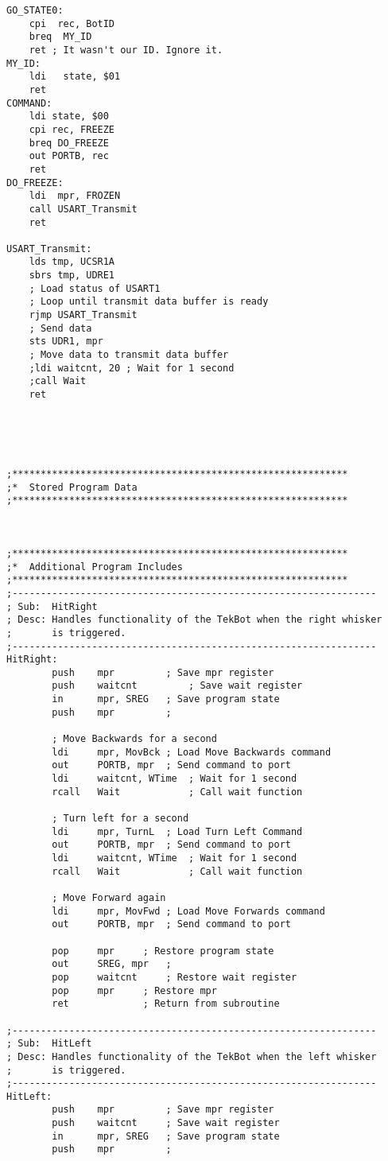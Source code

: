 \documentclass[12pt,letterpaper]{article}
\begin{document}
\begin{verbatim}
GO_STATE0:
    cpi  rec, BotID
    breq  MY_ID
    ret ; It wasn't our ID. Ignore it.
MY_ID:
    ldi   state, $01
    ret
COMMAND:
    ldi state, $00
    cpi rec, FREEZE
    breq DO_FREEZE
    out PORTB, rec
    ret
DO_FREEZE:
    ldi  mpr, FROZEN
    call USART_Transmit
    ret

USART_Transmit:
    lds tmp, UCSR1A
    sbrs tmp, UDRE1
    ; Load status of USART1
    ; Loop until transmit data buffer is ready
    rjmp USART_Transmit
    ; Send data
    sts UDR1, mpr
    ; Move data to transmit data buffer
    ;ldi waitcnt, 20 ; Wait for 1 second
    ;call Wait
    ret





;***********************************************************
;*	Stored Program Data
;***********************************************************



;***********************************************************
;*	Additional Program Includes
;***********************************************************
;----------------------------------------------------------------
; Sub:	HitRight
; Desc:	Handles functionality of the TekBot when the right whisker
;		is triggered.
;----------------------------------------------------------------
HitRight:
		push	mpr			; Save mpr register
		push	waitcnt			; Save wait register
		in		mpr, SREG	; Save program state
		push	mpr			;

		; Move Backwards for a second
		ldi		mpr, MovBck	; Load Move Backwards command
		out		PORTB, mpr	; Send command to port
		ldi		waitcnt, WTime	; Wait for 1 second
		rcall	Wait			; Call wait function

		; Turn left for a second
		ldi		mpr, TurnL	; Load Turn Left Command
		out		PORTB, mpr	; Send command to port
		ldi		waitcnt, WTime	; Wait for 1 second
		rcall	Wait			; Call wait function

		; Move Forward again
		ldi		mpr, MovFwd	; Load Move Forwards command
		out		PORTB, mpr	; Send command to port

		pop		mpr		; Restore program state
		out		SREG, mpr	;
		pop		waitcnt		; Restore wait register
		pop		mpr		; Restore mpr
		ret				; Return from subroutine

;----------------------------------------------------------------
; Sub:  HitLeft
; Desc: Handles functionality of the TekBot when the left whisker
;       is triggered.
;----------------------------------------------------------------
HitLeft:
        push    mpr         ; Save mpr register
        push    waitcnt     ; Save wait register
        in      mpr, SREG   ; Save program state
        push    mpr         ;


\end{verbatim}
\end{document}
